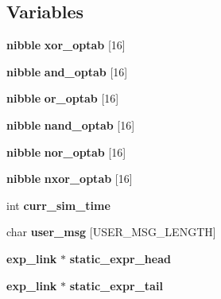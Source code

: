 \subsection*{Variables}
\begin{CompactItemize}
\item 
{\bf nibble} {\bf xor\_\-optab} [16]
\item 
{\bf nibble} {\bf and\_\-optab} [16]
\item 
{\bf nibble} {\bf or\_\-optab} [16]
\item 
{\bf nibble} {\bf nand\_\-optab} [16]
\item 
{\bf nibble} {\bf nor\_\-optab} [16]
\item 
{\bf nibble} {\bf nxor\_\-optab} [16]
\item 
int {\bf curr\_\-sim\_\-time}
\item 
char {\bf user\_\-msg} [USER\_\-MSG\_\-LENGTH]
\item 
{\bf exp\_\-link} $\ast$ {\bf static\_\-expr\_\-head}
\item 
{\bf exp\_\-link} $\ast$ {\bf static\_\-expr\_\-tail}
\end{CompactItemize}


